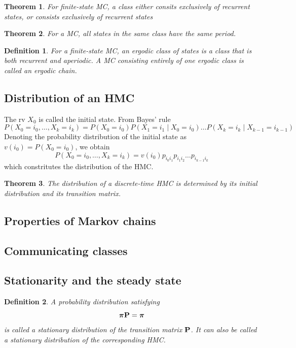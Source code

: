 \documentclass[12pt,a4paper]{article}
\newtheorem{theorem}{Theorem}
\newtheorem{definition}{Definition}
\newcommand{\bP}{\bold P}
\begin{document}
	\begin{theorem}
	For finite-state MC, a class either consits exclusively of recurrent states, or consists exclusively of recurrent states	
	\end{theorem}
	
	
	\begin{theorem}
		For a MC, all states in the same class have the same period.	
	\end{theorem}
	\begin{definition}
		For a finite-state MC, an ergodic class of states is a class that is both recurrent and aperiodic. A MC consisting entirely of one ergodic class is called an ergodic chain.
	\end{definition}

	
\subsection{Distribution of an HMC}
The rv $X_0$ is called the initial state. From Bayes' rule
\begin{equation}
	P(X_0 = i_0, \ldots, X_k = i_k) = P(X_0 = i_0) P(X_1 = i_1 \mid X_0 = i_0)\ldots P(X_k = i_k \mid X_{k-1} = i_{k-1})
\end{equation}
Denoting the probability distribution of the initial state as $v(i_0) = P(X_0 = i_0)$, we obtain  
\begin{equation}
	P(X_0 = i_0, \ldots, X_k = i_k) = v(i_0) p_{i_0i_1} p_{i_1i_2}\ldots p_{i_{k-1}i_k}
\end{equation}
which constritutes the distribution of the HMC.
\begin{theorem}
The distribution of a discrete-time HMC is determined by its initial distribution and its transition matrix.	
	\end{theorem}
	
\subsection{Properties of Markov chains}
\subsection{Communicating classes}
\subsection{Stationarity and the steady state}

\begin{definition}
	A probability distribution satisfying 
	\begin{equation}
		 {\bm\pi} \bP  = {\bm\pi}
	\end{equation}
	is called a \textit{stationary distribution} of the transition matrix $\bP$. It can also be called a stationary distribution of the corresponding HMC.
\end{definition}
\end{document}
